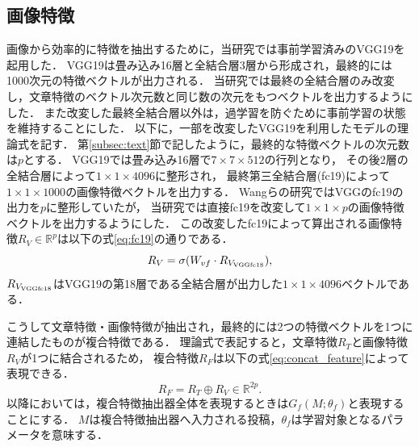 \subsection{画像特徴}
画像から効率的に特徴を抽出するために，当研究では事前学習済みのVGG19\cite{DBLP:journals/corr/SimonyanZ14a}を起用した．
VGG19は畳み込み16層と全結合層3層から形成され，最終的には1000次元の特徴ベクトルが出力される．
当研究では最終の全結合層のみ改変し，文章特徴のベクトル次元数と同じ数の次元をもつベクトルを出力するようにした．
また改変した最終全結合層以外は，過学習を防ぐために事前学習の状態を維持することにした．
以下に，一部を改変したVGG19を利用したモデルの理論式を記す．
第\ref{subsec:text}節で記したように，最終的な特徴ベクトルの次元数は$p$とする．
VGG19では畳み込み16層で$7 \times 7 \times 512$の行列となり，
その後2層の全結合層によって$1 \times 1 \times 4096$に整形され，
最終第三全結合層(fc19)によって$1 \times 1 \times 1000$の画像特徴ベクトルを出力する．
Wangらの研究\cite{Wang:2018:EEA:3219819.3219903}ではVGGのfc19の出力を$p$に整形していたが，
当研究では直接fc19を改変して$1 \times 1 \times p$の画像特徴ベクトルを出力するようにした．
この改変したfc19によって算出される画像特徴$R_V \in \mathbb{R}^p$は以下の式\ref{eq:fc19}の通りである．
\begin{equation}
    \label{eq:fc19}
    R_V = \sigma(W_{vf} \cdot R_{V_{\rm VGGfc18}}),
\end{equation}
$R_{V_{\rm VGGfc18}}$はVGG19の第18層である全結合層が出力した$1 \times 1 \times 4096$ベクトルである．

こうして文章特徴・画像特徴が抽出され，最終的には2つの特徴ベクトルを1つに連結したものが複合特徴である．
理論式で表記すると，文章特徴$R_T$と画像特徴$R_V$が1つに結合されるため，
複合特徴$R_F$は以下の式\ref{eq:concat_feature}によって表現できる．
\begin{equation}
    \label{eq:concat_feature}
    R_F = R_T \oplus R_V \in \mathbb{R}^{2p}.
\end{equation}
以降においては，複合特徴抽出器全体を表現するときは$G_f(M; \theta_f)$と表現することにする．
$M$は複合特徴抽出器へ入力される投稿，$\theta_f$は学習対象となるパラメータを意味する．
%
